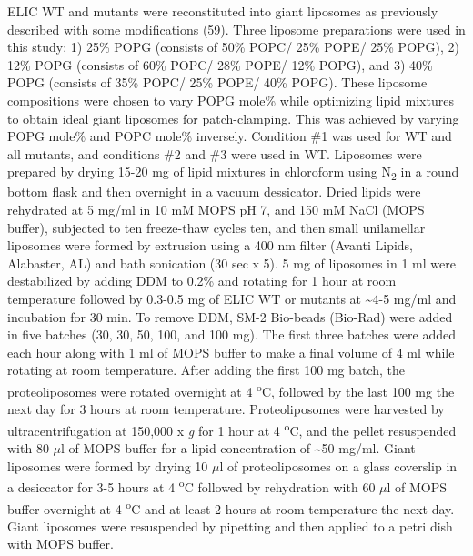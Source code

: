ELIC WT and mutants were reconstituted into giant liposomes as
previously described with some modifications (59). Three liposome
preparations were used in this study: 1) 25\% POPG (consists of 50\%
POPC/ 25\% POPE/ 25\% POPG), 2) 12\% POPG (consists of 60\% POPC/ 28\%
POPE/ 12\% POPG), and 3) 40\% POPG (consists of 35\% POPC/ 25\% POPE/
40\% POPG). These liposome compositions were chosen to vary POPG mole\%
while optimizing lipid mixtures to obtain ideal giant liposomes for
patch-clamping. This was achieved by varying POPG mole\% and POPC mole\%
inversely. Condition \#1 was used for WT and all mutants, and conditions
\#2 and \#3 were used in WT. Liposomes were prepared by drying 15-20 mg
of lipid mixtures in chloroform using N\textsubscript{2} in a round
bottom flask and then overnight in a vacuum dessicator. Dried lipids
were rehydrated at 5 mg/ml in 10 mM MOPS pH 7, and 150 mM NaCl (MOPS
buffer), subjected to ten freeze-thaw cycles ten, and then small
unilamellar liposomes were formed by extrusion using a 400 nm filter
(Avanti Lipids, Alabaster, AL) and bath sonication (30 sec x 5). 5 mg of
liposomes in 1 ml were destabilized by adding DDM to 0.2\% and rotating
for 1 hour at room temperature followed by 0.3-0.5 mg of ELIC WT or
mutants at \textasciitilde{}4-5 mg/ml and incubation for 30 min. To
remove DDM, SM-2 Bio-beads (Bio-Rad) were added in five batches (30, 30,
50, 100, and 100 mg). The first three batches were added each hour along
with 1 ml of MOPS buffer to make a final volume of 4 ml while rotating
at room temperature. After adding the first 100 mg batch, the
proteoliposomes were rotated overnight at 4 \textsuperscript{o}C,
followed by the last 100 mg the next day for 3 hours at room
temperature. Proteoliposomes were harvested by ultracentrifugation at
150,000 x \emph{g} for 1 hour at 4 \textsuperscript{o}C, and the pellet
resuspended with 80 $\mu$l of MOPS buffer for a lipid concentration of
\textasciitilde{}50 mg/ml. Giant liposomes were formed by drying 10 $\mu$l
of proteoliposomes on a glass coverslip in a desiccator for 3-5 hours at
4 \textsuperscript{o}C followed by rehydration with 60 $\mu$l of MOPS buffer
overnight at 4 \textsuperscript{o}C and at least 2 hours at room
temperature the next day. Giant liposomes were resuspended by pipetting
and then applied to a petri dish with MOPS buffer.

